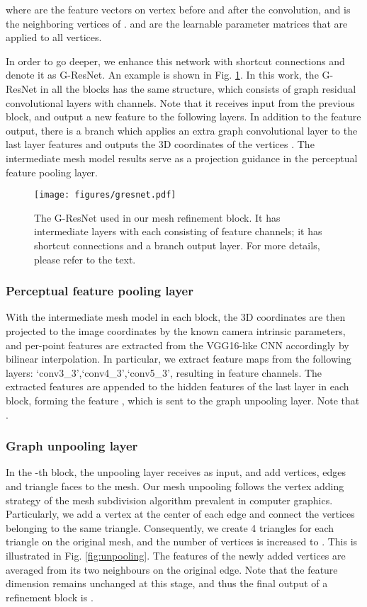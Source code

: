 \documentclass[runningheads]{llncs}
\newcommand{\figref}[1]{Fig. \ref{#1}}
\begin{document}
where  are the feature vectors on vertex  before and after the convolution, and  is the neighboring vertices of .  and  are the learnable parameter matrices that are applied to all vertices.

In order to go deeper, we enhance this network with shortcut connections \cite{} and denote it as G-ResNet. An example is shown in \figref{fig:gresnet}. In this work, the G-ResNet in all the blocks has the same structure, which consists of  graph residual convolutional layers with  channels. Note that it receives input  from the previous block, and output a new feature  to the following layers. In addition to the feature output, there is a branch which applies an extra graph convolutional layer to the last layer features and outputs the 3D coordinates of the vertices . The intermediate mesh model results serve as a projection guidance in the perceptual feature pooling layer.


\begin{figure}[tbhp]
\centering
\texttt{[image: figures/gresnet.pdf]}
\caption{The G-ResNet used in our mesh refinement block. It has  intermediate layers with each consisting of  feature channels; it has shortcut connections and a branch output layer. For more details, please refer to the text.}
\label{fig:gresnet}
\end{figure}

\subsubsection{Perceptual feature pooling layer}
With the intermediate mesh model in each block, the 3D coordinates are then projected to the image coordinates by the known camera intrinsic parameters, and per-point features are extracted from the VGG16-like CNN accordingly by bilinear interpolation. In particular, we extract feature maps from the following layers: `conv3\_3',`conv4\_3',`conv5\_3', resulting in  feature channels. The extracted features are appended to the hidden features of the last layer in each block, forming the feature , which is sent to the graph unpooling layer. Note that .

\subsubsection{Graph unpooling layer}
In the -th block, the unpooling layer receives  as input, and add vertices, edges and triangle faces to the mesh. Our mesh unpooling follows the vertex adding strategy of the mesh subdivision algorithm prevalent in computer graphics. Particularly, we add a vertex at the center of each edge and connect the vertices belonging to the same triangle. Consequently, we create 4 triangles for each triangle on the original mesh, and the number of vertices is increased to . This is illustrated in \figref{fig:unpooling}. The features of the newly added vertices are averaged from its two neighbours on the original edge. Note that the feature dimension remains unchanged at this stage, and thus the final output of a refinement block is .
\fi
\end{document}
